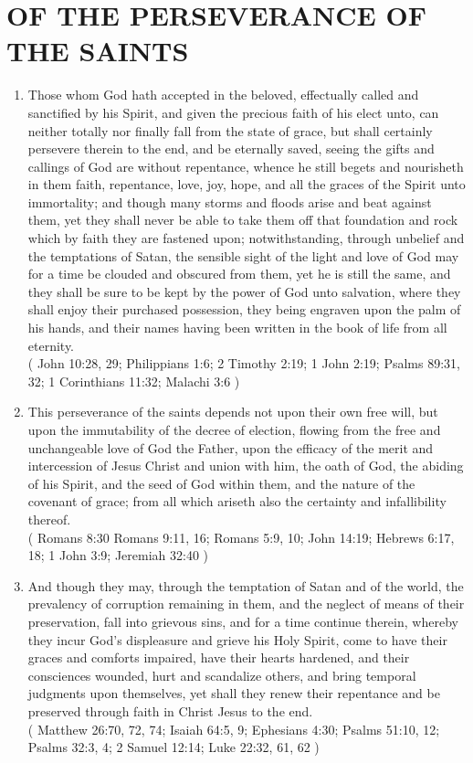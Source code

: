 \documentclass[12pt,a4paper]{book}
\begin{document}
\chapter{OF THE PERSEVERANCE OF THE SAINTS}
\label{ch-per-sai}
\begin{enumerate}
\item
\label{ch-per-sai-1}
Those whom God hath accepted in the beloved, effectually called and sanctified by his Spirit, and given the precious faith of his elect unto, can neither totally nor finally fall from the state of grace, but shall certainly persevere therein to the end, and be eternally saved, seeing the gifts and callings of God are without repentance, whence he still begets and nourisheth in them faith, repentance, love, joy, hope, and all the graces of the Spirit unto immortality; and though many storms and floods arise and beat against them, yet they shall never be able to take them off that foundation and rock which by faith they are fastened upon; notwithstanding, through unbelief and the temptations of Satan, the sensible sight of the light and love of God may for a time be clouded and obscured from them, yet he is still the same, and they shall be sure to be kept by the power of God unto salvation, where they shall enjoy their purchased possession, they being engraven upon the palm of his hands, and their names having been written in the book of life from all eternity.\\
( John 10:28, 29; Philippians 1:6; 2 Timothy 2:19; 1 John 2:19; Psalms 89:31, 32; 1 Corinthians 11:32; Malachi 3:6 )
\item
\label{ch-per-sai-2}
This perseverance of the saints depends not upon their own free will, but upon the immutability of the decree of election, flowing from the free and unchangeable love of God the Father, upon the efficacy of the merit and intercession of Jesus Christ and union with him, the oath of God, the abiding of his Spirit, and the seed of God within them, and the nature of the covenant of grace; from all which ariseth also the certainty and infallibility thereof.\\
( Romans 8:30 Romans 9:11, 16; Romans 5:9, 10; John 14:19; Hebrews 6:17, 18; 1 John 3:9; Jeremiah 32:40 )
\item
\label{ch-per-sai-3}
And though they may, through the temptation of Satan and of the world, the prevalency of corruption remaining in them, and the neglect of means of their preservation, fall into grievous sins, and for a time continue therein, whereby they incur God's displeasure and grieve his Holy Spirit, come to have their graces and comforts impaired, have their hearts hardened, and their consciences wounded, hurt and scandalize others, and bring temporal judgments upon themselves, yet shall they renew their repentance and be preserved through faith in Christ Jesus to the end.\\
( Matthew 26:70, 72, 74; Isaiah 64:5, 9; Ephesians 4:30; Psalms 51:10, 12; Psalms 32:3, 4; 2 Samuel 12:14; Luke 22:32, 61, 62 )
\end{enumerate}
\end{document}
